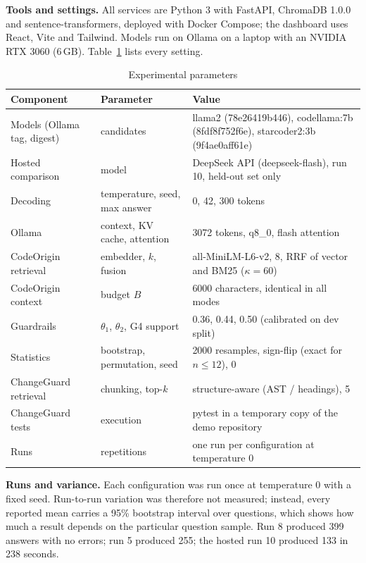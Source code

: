 \documentclass[12pt,onecolumn,draftclsnofoot]{IEEEtran}
\begin{document}
\textbf{Tools and settings.} All services are Python 3 with FastAPI, ChromaDB 1.0.0 and sentence-transformers, deployed with Docker Compose; the dashboard uses React, Vite and Tailwind. Models run on Ollama on a laptop with an NVIDIA RTX 3060 (6\,GB). Table~\ref{tab:params} lists every setting.

\begin{table}[!t]
\caption{Experimental parameters}
\label{tab:params}
\centering
\small
\begin{tabular}{@{}p{3.4cm}p{4.0cm}p{7.6cm}@{}}
\toprule
Component & Parameter & Value \\
\midrule
Models (Ollama tag, digest) & candidates & llama2 (78e26419b446), codellama:7b (8fdf8f752f6e), starcoder2:3b (9f4ae0aff61e) \\
Hosted comparison & model & DeepSeek API (deepseek-flash), run 10, held-out set only \\
Decoding & temperature, seed, max answer & 0, 42, 300 tokens \\
Ollama & context, KV cache, attention & 3072 tokens, q8\_0, flash attention \\
CodeOrigin retrieval & embedder, $k$, fusion & all-MiniLM-L6-v2, 8, RRF of vector and BM25 ($\kappa=60$) \\
CodeOrigin context & budget $B$ & 6000 characters, identical in all modes \\
Guardrails & $\theta_1$, $\theta_2$, G4 support & 0.36, 0.44, 0.50 (calibrated on dev split) \\
Statistics & bootstrap, permutation, seed & 2000 resamples, sign-flip (exact for $n\le12$), 0 \\
ChangeGuard retrieval & chunking, top-$k$ & structure-aware (AST / headings), 5 \\
ChangeGuard tests & execution & pytest in a temporary copy of the demo repository \\
Runs & repetitions & one run per configuration at temperature 0 \\
\bottomrule
\end{tabular}
\end{table}

\textbf{Runs and variance.} Each configuration was run once at temperature 0 with a fixed seed. Run-to-run variation was therefore not measured; instead, every reported mean carries a 95\% bootstrap interval over questions, which shows how much a result depends on the particular question sample. Run 8 produced 399 answers with no errors; run 5 produced 255; the hosted run 10 produced 133 in 238 seconds.
\end{document}
